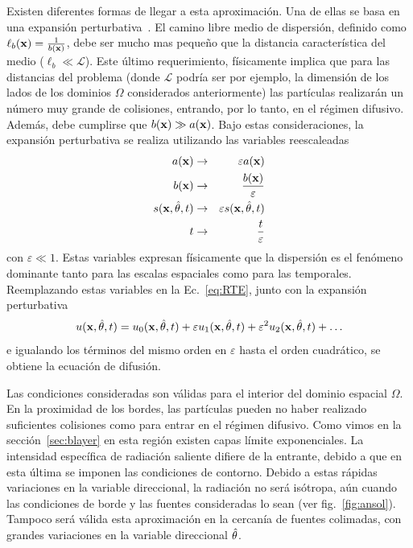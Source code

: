 Existen diferentes formas 
de llegar a esta aproximación. Una de ellas se basa en  una expansión perturbativa~\cite{Larsen1974,Larsen1987,Arridge2009}.  El camino libre medio de dispersión, definido como $\ell_b(\mathbf{x})=\frac{1}{b(\mathbf{x})}$, debe 
ser mucho mas pequeño que la distancia característica 
del medio ($\ell_b\ll \mathcal{L}$). 
Este último requerimiento, físicamente implica que para las distancias del problema (donde $\mathcal{L}$ 
podría ser por ejemplo, la dimensión de los lados de los dominios $\Omega$ considerados anteriormente) las partículas realizarán un número muy grande de colisiones, entrando, por lo tanto, en el régimen difusivo. Además, debe cumplirse que $b(\mathbf{x}) \gg a(\mathbf{x})$. 
Bajo estas consideraciones, 
la expansión perturbativa se realiza utilizando las variables 
reescaleadas 
\begin{eqnarray}
a(\mathbf{x}) & \rightarrow & \varepsilon a(\mathbf{x}) \nonumber \\
b(\mathbf{x}) &\rightarrow & \frac{b(\mathbf{x})}{\varepsilon} \nonumber \\
s(\mathbf{x},\hat{\theta},t) & \rightarrow &  \varepsilon s(\mathbf{x},\hat{\theta},t) \nonumber \\
t & \rightarrow & \frac{t}{\varepsilon}
\end{eqnarray} 
con $\varepsilon \ll 1$. Estas variables  expresan físicamente que la dispersión es el fenómeno dominante tanto para las 
escalas espaciales como para las temporales. Reemplazando 
estas variables en la Ec.~\eqref{eq:RTE}, junto con la expansión perturbativa 
\begin{equation}
u(\mathbf{x},\hat{\theta},t)=u_0(\mathbf{x},\hat{\theta},t)+\varepsilon u_1(\mathbf{x},\hat{\theta},t)+\varepsilon^2 u_2(\mathbf{x},\hat{\theta},t)+\ldots
\end{equation} 
e igualando los términos del mismo orden en $\varepsilon$ 
hasta el orden cuadrático, se obtiene la ecuación de difusión.

Las condiciones consideradas son válidas para el interior del dominio espacial $\Omega$.
 En la proximidad de los bordes, las partículas pueden no haber realizado suficientes colisiones 
 como para entrar en el régimen difusivo. Como vimos en la sección~\ref{sec:blayer} en esta región existen capas límite exponenciales. 
La intensidad específica de radiación saliente difiere 
de la entrante, debido a que en esta última se imponen 
las condiciones de contorno. 
 Debido a estas rápidas variaciones en la variable direccional, la radiación no será isótropa, 
aún cuando las condiciones de borde y las fuentes consideradas lo sean (ver fig.~\ref{fig:ansol}). Tampoco será válida esta 
aproximación en la cercanía de fuentes colimadas, 
con grandes variaciones en la variable 
direccional $\hat{\theta}$.

